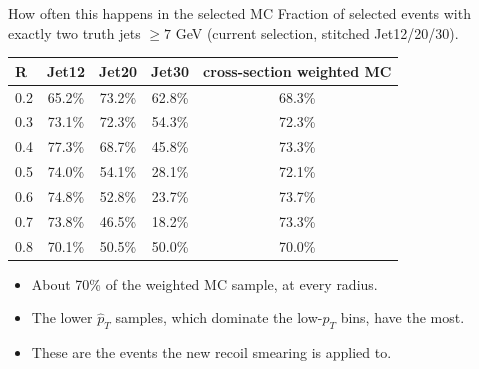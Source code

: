 \documentclass[aspectratio=169,10pt]{beamer}
\begin{document}
\begin{frame}{How often this happens in the selected MC}
  \small
  Fraction of selected events with exactly two truth jets $\geq 7$ GeV
  (current selection, stitched Jet12/20/30).
  \vspace{0.5em}

  \centering
  \begin{tabular}{lcccc}
    \toprule
    R & Jet12 & Jet20 & Jet30 & cross-section weighted MC \\
    \midrule
    0.2 & 65.2\% & 73.2\% & 62.8\% & 68.3\% \\
    0.3 & 73.1\% & 72.3\% & 54.3\% & 72.3\% \\
    0.4 & 77.3\% & 68.7\% & 45.8\% & 73.3\% \\
    0.5 & 74.0\% & 54.1\% & 28.1\% & 72.1\% \\
    0.6 & 74.8\% & 52.8\% & 23.7\% & 73.7\% \\
    0.7 & 73.8\% & 46.5\% & 18.2\% & 73.3\% \\
    0.8 & 70.1\% & 50.5\% & 50.0\% & 70.0\% \\
    \bottomrule
  \end{tabular}
  \vspace{0.6em}
  \begin{itemize}
    \item About 70\% of the weighted MC sample, at every radius.
    \item The lower $\hat p_T$ samples, which dominate the low-$p_T$ bins, have the most.
    \item These are the events the new recoil smearing is applied to.
  \end{itemize}
\end{frame}
\end{document}
